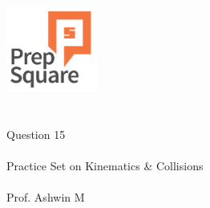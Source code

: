 \documentclass{beamer}
\begin{document}
\begin{center}
\ \\ \ \\
\includegraphics[width=30mm]{Logo-final.png} \\
\ \\ \ \\ 
{\huge Question 15 \\ \ \\ }
{\Large
Practice Set on Kinematics \& Collisions
}
{\large \ \\ \ \\ Prof. Ashwin M }
\end{center}
\end{document}
